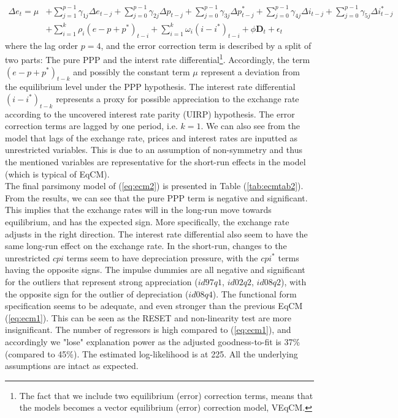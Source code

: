 \documentclass[10pt]{article}
\numberwithin{equation}{section}
\numberwithin{table}{section}
\numberwithin{figure}{section}
\begin{document}
\begin{spacing}{1.5}
\begin{align}
\nonumber    \Delta e_t = \mu &+ \sum_{j=1}^{p-1} \gamma_{1j} \Delta e_{t-j} + \sum_{j=0}^{p-1} \gamma_{2j} \Delta p_{t-j} + \sum_{j=0}^{p-1} \gamma_{3j} \Delta p^*_{t-j} + \sum_{j=0}^{p-1} \gamma_{4j} \Delta i_{t-j} + \sum_{j=0}^{p-1} \gamma_{5j} \Delta i_{t-j}^*\\
    &+ \sum_{i=1}^k\rho_i\left(e - p + p^* \right)_{t-i} + \sum_{i=1}^k \omega_{i}\left(i - i^* \right)_{t-i} + \phi \mathbf{D}_t + \epsilon_t
    \label{eq:ecm2}
\end{align}
where the lag order $p=4$, and the error correction term is described by a split of two parts: The pure PPP and the interst rate differential\footnote{The fact that we include two equilibrium (error) correction terms, means that the models becomes a vector equilibrium (error) correction model, VEqCM.}. Accordingly, the term $(e - p + p^*)_{t-k}$ and possibly the constant term $\mu$ represent a deviation from the equilibrium level under the PPP hypothesis. The interest rate differential $(i-i^*)_{t-k}$ represents a proxy for possible appreciation to the exchange rate according to the uncovered interest rate parity (UIRP) hypothesis. The error correction terms are lagged by one period, i.e. $k=1$. We can also see from the model that lags of the exchange rate, prices and interest rates are inputted as unrestricted variables. This is due to an assumption of non-symmetry and thus the mentioned variables are representative for the short-run effects in the model (which is typical of EqCM).\\
\indent The final parsimony model of (\ref{eq:ecm2}) is presented in Table (\ref{tab:ecmtab2}). From the results, we can see that the pure PPP term is negative and significant. This implies that the exchange rates will in the long-run move towards equilibrium, and has the expected sign. More specifically, the exchange rate adjusts in the right direction. The interest rate differential also seem to have the same long-run effect on the exchange rate. In the short-run, changes to the unrestricted $cpi$ terms seem to have depreciation pressure, with the $cpi^*$ terms having the opposite signs. The impulse dummies are all negative and significant for the outliers that represent strong appreciation ($id97q1$, $id02q2$, $id08q2$), with the opposite sign for the outlier of depreciation ($id08q4$). The functional form specification seems to be adequate, and even stronger than the previous EqCM (\ref{eq:ecm1}). This can be seen as the RESET and non-linearity test are more insignificant. The number of regressors is high compared to (\ref{eq:ecm1}), and accordingly we "lose" explanation power as the adjusted goodness-to-fit is 37\% (compared to 45\%). The estimated log-likelihood is at 225. All the underlying assumptions are intact as expected.\\ 

\end{spacing}
\end{document}
